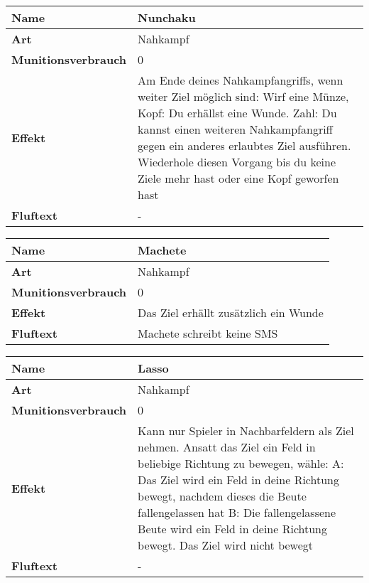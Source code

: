 \begin{table}[H]
  \begin{center}
    \label{tab:table1}
    \begin{tabular}{|l|p{8cm}|}
      \hline
      \textbf{Name} & Nunchaku \\
      \hline
      \textbf{Art} & Nahkampf \\
      \hline
      \textbf{Munitionsverbrauch} & 0 \\
      \hline
      \textbf{Effekt} & Am Ende deines Nahkampfangriffs, wenn weiter Ziel möglich sind: Wirf eine Münze,
                        Kopf: Du erhällst eine Wunde. Zahl: Du kannst einen weiteren Nahkampfangriff gegen
                        ein anderes erlaubtes Ziel ausführen. Wiederhole diesen Vorgang bis du keine Ziele
                        mehr hast oder eine Kopf geworfen hast \\
      \hline
      \textbf{Fluftext} & - \\
      \hline
    \end{tabular}
  \end{center}
\end{table}

\begin{table}[H]
  \begin{center}
    \label{tab:table1}
    \begin{tabular}{|l|p{8cm}|}
      \hline
      \textbf{Name} & Machete \\
      \hline
      \textbf{Art} & Nahkampf \\
      \hline
      \textbf{Munitionsverbrauch} & 0 \\
      \hline
      \textbf{Effekt} & Das Ziel erhällt zusätzlich ein Wunde \\
      \hline
      \textbf{Fluftext} & Machete schreibt keine SMS \\
      \hline
    \end{tabular}
  \end{center}
\end{table}

\begin{table}[H]
  \begin{center}
    \label{tab:table1}
    \begin{tabular}{|l|p{8cm}|}
      \hline
      \textbf{Name} & Lasso \\
      \hline
      \textbf{Art} & Nahkampf \\
      \hline
      \textbf{Munitionsverbrauch} & 0 \\
      \hline
      \textbf{Effekt} & Kann nur Spieler in Nachbarfeldern als Ziel nehmen. Ansatt das Ziel ein Feld in
                        beliebige Richtung zu bewegen, wähle:
                        A: Das Ziel wird ein Feld in deine Richtung bewegt, nachdem dieses die Beute
                           fallengelassen hat
                        B: Die fallengelassene Beute wird ein Feld in deine Richtung bewegt. Das Ziel
                           wird nicht bewegt \\
      \hline
      \textbf{Fluftext} & - \\
      \hline
    \end{tabular}
  \end{center}
\end{table}